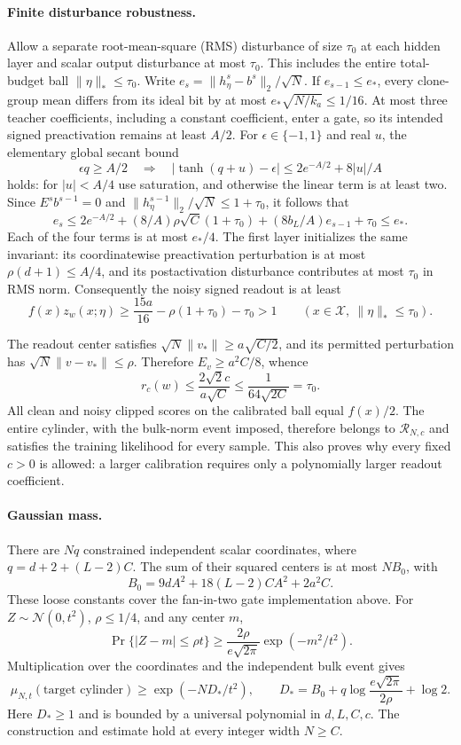 \paragraph{Finite disturbance robustness.}
Allow a separate root-mean-square (RMS) disturbance of size $\tau_0$ at each hidden layer and
scalar output disturbance at most $\tau_0$. This includes the entire
total-budget ball $\|\eta\|_*\le\tau_0$.
Write $e_s=\|h^s_\eta-b^s\|_2/\sqrt N$.
If $e_{s-1}\le e_*$, every clone-group mean differs from its ideal bit by
at most $e_*\sqrt{N/k_a}\le1/16$. At most three teacher coefficients,
including a constant coefficient, enter a gate, so its intended signed
preactivation remains at least $A/2$.
For $\epsilon\in\{-1,1\}$ and real $u$, the elementary global secant bound
\[
 \epsilon q\ge A/2
 \quad\Longrightarrow\quad
 |\tanh(q+u)-\epsilon|\le2e^{-A/2}+8|u|/A
\]
holds: for $|u|<A/4$ use saturation, and otherwise the linear term is at
least two. Since $E^sb^{s-1}=0$ and
$\|h^{s-1}_\eta\|_2/\sqrt N\le1+\tau_0$, it follows that
\[
 e_s\le2e^{-A/2}+
          (8/A)\rho\sqrt C(1+\tau_0)
          +(8b_L/A)e_{s-1}+\tau_0\le e_*.
\]
Each of the four terms is at most $e_*/4$.
The first layer initializes the same invariant: its coordinatewise
preactivation perturbation is at most $\rho(d+1)\le A/4$, and its
postactivation disturbance contributes at most $\tau_0$ in RMS norm.
Consequently the noisy signed readout is at least
\[
 f(x)z_w(x;\eta)
 \ge\frac{15a}{16}-\rho(1+\tau_0)-\tau_0>1
 \qquad(x\in\mathcal X,\ \|\eta\|_*\le\tau_0).
\]

The readout center satisfies $\sqrt N\|v_*\|\ge a\sqrt{C/2}$, and its
permitted perturbation has $\sqrt N\|v-v_*\|\le\rho$.
Therefore $E_v\ge a^2C/8$, whence
\[
 r_c(w)\le\frac{2\sqrt2c}{a\sqrt C}
       \le\frac1{64\sqrt{2C}}=\tau_0.
\]
All clean and noisy clipped scores on the calibrated ball equal $f(x)/2$.
The entire cylinder, with the bulk-norm event imposed, therefore belongs
to $\mathcal R_{N,c}$ and satisfies the training likelihood for every sample.
This also proves why every fixed $c>0$ is allowed: a larger calibration
requires only a polynomially larger readout coefficient.

\paragraph{Gaussian mass.}
There are $Nq$ constrained independent scalar coordinates, where
$q=d+2+(L-2)C$. The sum of their squared centers is at most $NB_0$, with
\[
 B_0=9dA^2+18(L-2)CA^2+2a^2C.
\]
These loose constants cover the fan-in-two gate implementation above.
For $Z\sim\mathcal N(0,t^2)$, $\rho\le1/4$, and any center $m$,
\[
 \Pr\{|Z-m|\le\rho t\}
 \ge\frac{2\rho}{e\sqrt{2\pi}}\exp(-m^2/t^2).
\]
Multiplication over the coordinates and the independent bulk event gives
\begin{equation}\label{eq:standalone-cylinder-mass}
 \mu_{N,t}(\text{target cylinder})
 \ge\exp(-ND_*/t^2),\qquad
 D_*=B_0+q\log\frac{e\sqrt{2\pi}}{2\rho}+\log2.
\end{equation}
Here $D_*\ge1$ and is bounded by a universal polynomial in $d,L,C,c$.
The construction and estimate hold at every integer width $N\ge C$.
